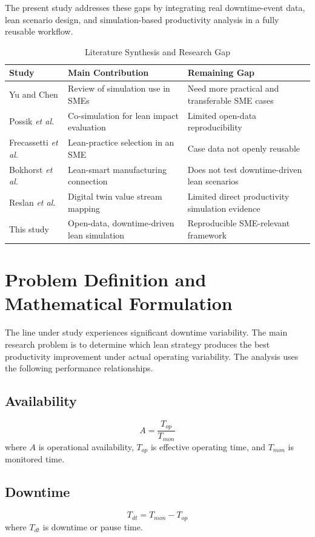 \documentclass[journal]{IEEEtran}
\begin{document}
The present study addresses these gaps by integrating real downtime-event data, lean scenario design, and simulation-based productivity analysis in a fully reusable workflow.

\begin{table}[!t]
\caption{Literature Synthesis and Research Gap}
\label{tab:litgap}
\centering
\begin{tabular}{p{2.6cm}p{3.2cm}p{2.2cm}}
\toprule
Study & Main Contribution & Remaining Gap \\
\midrule
[3] Yu and Chen & Review of simulation use in SMEs & Need more practical and transferable SME cases \\
[4] Possik \emph{et al.} & Co-simulation for lean impact evaluation & Limited open-data reproducibility \\
[5] Frecassetti \emph{et al.} & Lean-practice selection in an SME & Case data not openly reusable \\
[6] Bokhorst \emph{et al.} & Lean-smart manufacturing connection & Does not test downtime-driven lean scenarios \\
[10] Reslan \emph{et al.} & Digital twin value stream mapping & Limited direct productivity simulation evidence \\
This study & Open-data, downtime-driven lean simulation & Reproducible SME-relevant framework \\
\bottomrule
\end{tabular}
\end{table}

\section{Problem Definition and Mathematical Formulation}
The line under study experiences significant downtime variability. The main research problem is to determine which lean strategy produces the best productivity improvement under actual operating variability. The analysis uses the following performance relationships.

\subsection{Availability}
\begin{equation}
A = \frac{T_{op}}{T_{mon}}
\end{equation}
where $A$ is operational availability, $T_{op}$ is effective operating time, and $T_{mon}$ is monitored time.

\subsection{Downtime}
\begin{equation}
T_{dt} = T_{mon} - T_{op}
\end{equation}
where $T_{dt}$ is downtime or pause time.
\end{document}
